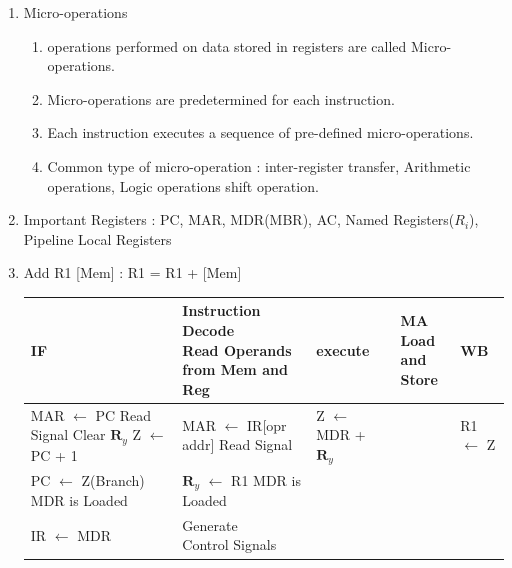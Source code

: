 \begin{enumerate}
    \newpage
    \item Micro-operations
    \begin{enumerate}
        \item operations performed on data stored in registers are called Micro-operations.
        \item Micro-operations are predetermined for each instruction.
        \item Each instruction executes a sequence of pre-defined micro-operations.
        \item Common type of micro-operation : inter-register transfer, Arithmetic operations, Logic operations
              shift operation.
    \end{enumerate}

    \item Important Registers : PC, MAR, MDR(MBR), AC, Named Registers(\(R_i\)), Pipeline Local Registers
    \item Add R1 [Mem] : R1 = R1 + [Mem] \\
    \begin{myTableStyle} \begin{tabular}{ |l|l|l|l|l| } \hline
        IF & \makecell[l]{ Instruction Decode \\ Read Operands \\from Mem and Reg}
        &execute & \makecell[l]{ MA \\ Load and \\Store}& WB   \\ \hline

        \makecell[l]{ MAR \(\leftarrow\) PC \\ Read Signal \\ Clear \large{ \( \boldsymbol R_y\)}  \\ Z \(\leftarrow\) PC + 1 }
        & \makecell[l]{ MAR \(\leftarrow\) IR[opr addr] \\ Read Signal } & Z \(\leftarrow\) MDR + \large{ \( \boldsymbol R_y\)}
        & & R1 \(\leftarrow\) Z \\ \hline

        \makecell[l]{ PC \(\leftarrow\) Z(Branch) \\ MDR is Loaded}
        & \makecell[l]{ \large{ \( \boldsymbol R_y\)} \(\leftarrow\) R1 \\ MDR is Loaded} & & & \\ \hline

        IR \(\leftarrow\) MDR & \makecell[l]{ Generate \\ Control Signals } & & & \\ \hline


\end{tabular}
\end{myTableStyle}
\end{enumerate}
